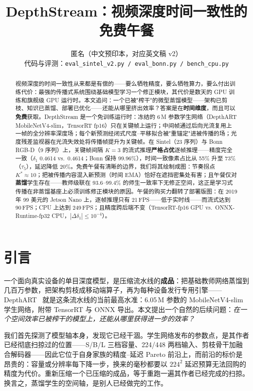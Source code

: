 \documentclass[10pt,twocolumn]{article}
\title{\LARGE\bf DepthStream：视频深度时间一致性的免费午餐}
\author{匿名（中文预印本，对应英文稿 v2）\\ \small 代码与评测：\texttt{eval\_sintel\_v2.py / eval\_bonn.py / bench\_cpu.py}}
\date{}
\begin{document}
\sloppy
\maketitle

\begin{abstract}
视频深度的时间一致性从来都是有偿的——要么牺牲精度，要么牺牲算力，要么付出训练代价：最强的传播式系统围绕基础模型学习一个修正模块，其代价是数天的 GPU 训练和旗舰级 GPU 运行时。本文追问：一个已被"榨干"的微型蒸馏模型——架构已剪枝、知识已蒸馏、部署已优化——还能从哪里挤出效率？答案是在\textbf{时间维度}，而且可以\textbf{免费}获取。DepthStream 是一个免训练运行时：冻结的 6\,M 参数学生网络（DepthART MobileNetV4-slim，TensorRT fp16）只在关键帧上运行；中间帧通过后向光流复用上一帧的全分辨率深度场；每个新预测经闭式尺度--平移拟合被"重锚定"进被传播的场；光度残差监视器在光流失效处将传播帧提升为关键帧。在 Sintel（23 序列）与 Bonn RGB-D（9 序列）上，关键帧间隔 $K{=}3$ 的流式推理\textbf{严格占优}逐帧推理——精度完全一致（$\delta_1$ 0.4614 vs.\ 0.4614；Bonn 保持 99.96\%），时间一致像素占比从 55\% 升至 73\%（$\tau_5$），延迟降低 20\%。免费午餐有清晰的边界，我们将其绘制成图：节奏拐点 $K^*{\approx}10$；把被传播内容混入新预测（时间 EMA）恰好在遮挡密集处有害；且午餐仅对\textbf{蒸馏}学生存在——教师级联在 93.6--99.4\% 的师生一致率下无修正空间，这正是学习式传播在非蒸馏基座上必须训练修正模块的原因。午餐的购买力翻转了部署版图：在 2019 年 99 美元的 Jetson Nano 上，逐帧推理只有 21\,FPS——低于实时线——而流式达到 90\,FPS；CPU 上达到 249\,FPS；且精度跨后端不变（TensorRT-fp16 GPU vs.\ ONNX-Runtime-fp32 CPU，$|\Delta\delta_1|\leq10^{-4}$）。
\end{abstract}

\section{引言}
\label{sec:intro}

一个面向真实设备的单目深度模型，是压缩流水线的\textbf{成品}：把基础教师网络蒸馏到几百万参数，把架构剪枝成移动端算子，再为每种设备发行专用引擎——DepthART~\cite{depthart} 就是这条流水线的当前最高水准：6.05\,M 参数的 MobileNetV4-slim 学生网络，附带 TensorRT 与 ONNX 导出。本文提出一个自然的后续问题：\emph{在一个空间效率已被榨干的模型上，还能从哪里获得进一步的效率？}

我们首先探测了模型轴本身，发现它已经干涸。学生网络发布的参数点，是其作者已经彻底扫掠过的位置——S/B/L 三档容量、224/448 两档输入、剪枝骨干加融合解码器——因此它位于自身家族的精度--延迟 Pareto 前沿上，而前沿的标价是昂贵的：容量或分辨率每下降一步，换来的毫秒都要以 $224^2$ 延迟预算无法回购的精度为代价。重新压缩一个已压缩的成品，等于重跑一遍其作者已经完成的扫掠。换言之，蒸馏学生的空间轴，是别人已经做完的工作。
\end{document}
